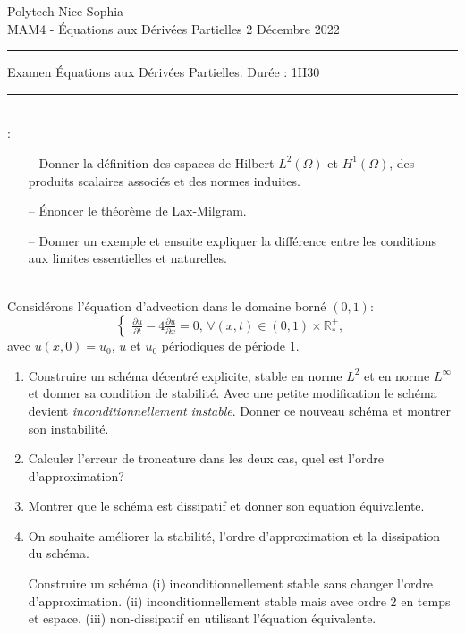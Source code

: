 \documentclass[12pt,a4paper]{article}
\begin{document}
 \hfill Polytech Nice Sophia\\
\noindent MAM4 - \'Equations aux D\'eriv\'ees Partielles \hfill 
2 Décembre 2022 \\

\hrule

\vspace{0.5cm}
\centerline {\large \sc Examen \'Equations aux D\'eriv\'ees Partielles. Dur\'ee : 1H30}
\vspace{0.5cm}


\hrule
\vspace{0.7cm}
\\

 :
\begin{itemize}
\item[--] Donner la définition des espaces de Hilbert $L^2(\Omega)$ et $H^1(\Omega)$, des produits scalaires associés et des normes induites.
\item[--] Énoncer le théorème de Lax-Milgram. 
\item[--] Donner un exemple et ensuite expliquer la différence entre les conditions aux limites essentielles et naturelles.
\end{itemize}

\\
\noindent Consid\'erons l'\'equation d'advection dans le domaine born\'e $(0,1)$:
$$
\begin{cases}
\displaystyle\frac{\partial u}{\partial t}-4\frac{\partial u}{\partial
  x}=0,\, \forall (x,t)\in(0,1)\times\mathbb{R}^+_*,
\end{cases}
$$
avec $u(x, 0) = u_0$, $u$ et $u_0$ p\'eriodiques de p\'eriode 1.
\begin{enumerate}
\item Construire un schéma décentré explicite, stable en norme $L^2$ et en norme $L^{\infty}$ et donner sa condition de stabilité. Avec une petite modification le schéma devient {\it inconditionnellement instable}. Donner ce nouveau schéma et montrer son instabilité. 

\item Calculer l'erreur de troncature dans les deux cas, quel est l'ordre d'approximation?

\item Montrer que le schéma est dissipatif et donner son equation équivalente.

\item  On souhaite améliorer la stabilité, l'ordre d'approximation et la dissipation du schéma.

Construire un schéma (i) inconditionnellement stable sans changer l'ordre d'approximation. (ii) inconditionnellement stable mais avec ordre 2 en temps et espace. (iii) non-dissipatif en utilisant l'équation équivalente.

\end{enumerate}
\end{document}
